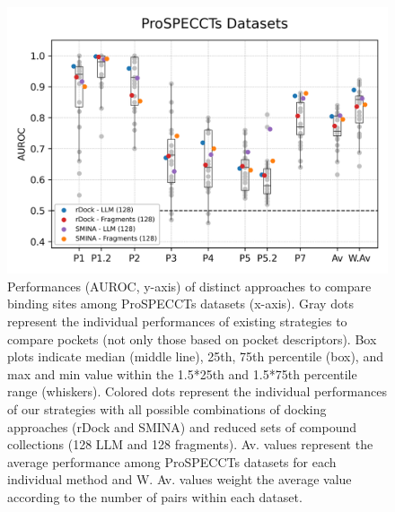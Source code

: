 \begin{figure}[htbp]
  \centering
  \includegraphics[width=0.7\linewidth]{figures/PocketVec/Supplementary/FigS11.png}
  \caption{
  Performances (AUROC, y-axis) of distinct approaches to compare binding sites among ProSPECCTs datasets (x-axis). Gray dots represent the individual performances of existing strategies to compare pockets (not only those based on pocket descriptors). Box plots indicate median (middle line), 25th, 75th percentile (box), and max and min value within the 1.5*25th and 1.5*75th percentile range (whiskers). Colored dots represent the individual performances of our strategies with all possible combinations of docking approaches (rDock and SMINA) and reduced sets of compound collections (128 LLM and 128 fragments). Av. values represent the average performance among ProSPECCTs datasets for each individual method and W. Av. values weight the average value according to the number of pairs within each dataset.
  }
  \label{PocketVec_FigS11}
\end{figure}

